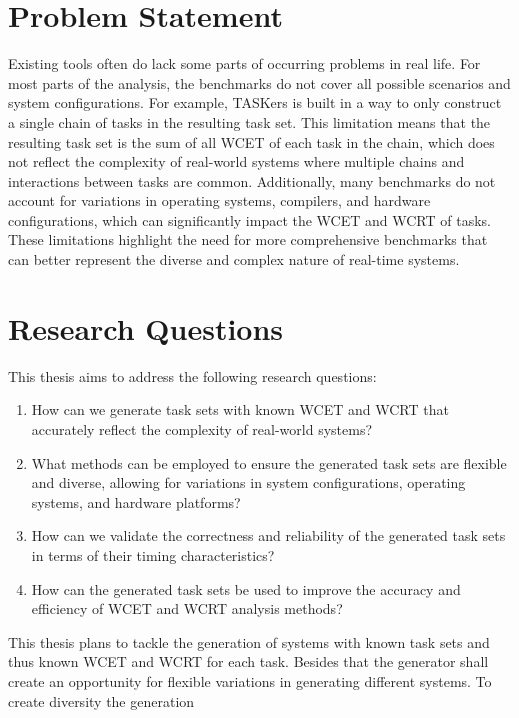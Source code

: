 \section{Problem Statement}\label{sec:problem_statement}
Existing tools often do lack some parts of occurring problems in real life.
For most parts of the analysis, the benchmarks do not cover all possible scenarios and system configurations.
For example, TASKers\cite{eichler_taskers_2018} is built in a way to only construct a single chain of tasks in the resulting task set.
This limitation means that the resulting task set is the sum of all \ac{WCET} of each task in the chain, which does not reflect the complexity of real-world systems where multiple chains and interactions between tasks are common.
Additionally, many benchmarks do not account for variations in operating systems, compilers, and hardware configurations, which can significantly impact the \ac{WCET} and \ac{WCRT} of tasks.
These limitations highlight the need for more comprehensive benchmarks that can better represent the diverse and complex nature of real-time systems.

\section{Research Questions}\label{sec:research_questions}
This thesis aims to address the following research questions:

\begin{enumerate}
	\item How can we generate task sets with known \ac{WCET} and \ac{WCRT} that accurately reflect the complexity of real-world systems?
	\item What methods can be employed to ensure the generated task sets are flexible and diverse, allowing for variations in system configurations, operating systems, and hardware platforms?
	\item How can we validate the correctness and reliability of the generated task sets in terms of their timing characteristics?
	\item How can the generated task sets be used to improve the accuracy and efficiency of \ac{WCET} and \ac{WCRT} analysis methods?
\end{enumerate}

This thesis plans to tackle the generation of systems with known task sets and thus known \ac{WCET} and \ac{WCRT} for each task.
Besides that the generator shall create an opportunity for flexible variations in generating different systems.
To create diversity the generation 

